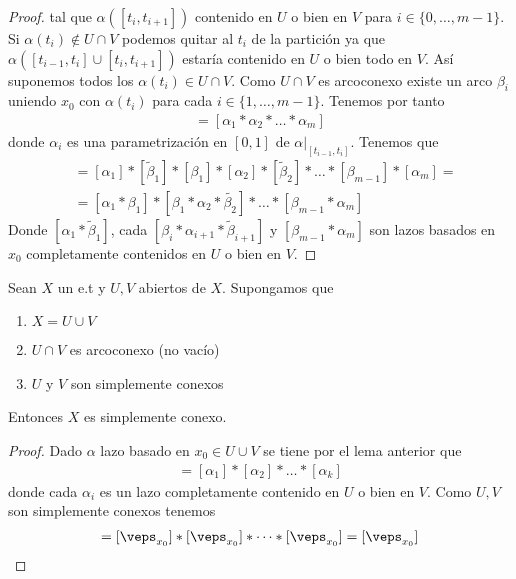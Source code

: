 \begin{lema}
\begin{proof}
        tal que $\alpha([t_i, t_{i+1}])$ contenido en $U$ o bien en $V$ para $i\in\{0,\dots,m-1\}$. Si $\alpha(t_i)\notin U\cap V$ podemos quitar al $t_i$ de la partición ya que $\alpha([t_{i-1}, t_i]\cup [t_i, t_{i+1}])$ estaría contenido en $U$ o bien todo en $V$. Así suponemos todos los $\alpha(t_i)\in U\cap V$. Como $U\cap V$ es arcoconexo existe un arco $\beta_i$ uniendo $x_0$ con $\alpha(t_i)$ para cada $i\in \{1,\dots,m-1\}$. Tenemos por tanto
        \begin{gather*}
            [\alpha] = [\alpha_1\ast\alpha_2\ast\dots\ast\alpha_m]
        \end{gather*}
        donde $\alpha_i$ es una parametrización en $[0,1]$ de $\alpha|_{[t_{i-1}, t_i]}$. Tenemos que
        \begin{align*}
            [\alpha] &= [\alpha_1] \ast [\tilde{\beta}_1] \ast [\beta_1] \ast [\alpha_2]\ast[\tilde{\beta}_2] \ast \dots \ast [\beta_{m-1}] \ast [\alpha_m] =\\
            &= [\alpha_1 \ast \beta_1] \ast [\beta_1\ast \alpha_2 \ast \tilde{\beta_2}] \ast \dots \ast [\beta_{m-1}\ast \alpha_m]
        \end{align*}
        Donde $[\alpha_1\ast \tilde{\beta}_1]$, cada $[\beta_i \ast \alpha_{i+1} \ast \tilde{\beta}_{i+1}]$ y $[\beta_{m-1}\ast \alpha_m]$ son lazos basados en $x_0$ completamente contenidos en $U$ o bien en $V$.
    \end{proof}
\end{lema}

\begin{teo}
    Sean $X$ un e.t y $U,V$ abiertos de $X$. Supongamos que
    \begin{enumerate}
        \item $X=U\cup V$
        \item $U\cap V$ es arcoconexo (no vacío)
        \item $U$ y $V$ son simplemente conexos
    \end{enumerate}
    Entonces $X$ es simplemente conexo.
    \begin{proof}
        Dado $\alpha$ lazo basado en $x_0\in U\cup V$ se tiene por el lema anterior que 
        \begin{gather*}
            [\alpha] = [\alpha_1]\ast [\alpha_2] \ast \dots \ast [\alpha_k]
        \end{gather*}
        donde cada $\alpha_i$ es un lazo completamente contenido en $U$ o bien en $V$. Como $U,V$ son simplemente conexos tenemos
        \begin{gather*}
            [\alpha] = [\veps_{x_0}]\ast[\veps_{x_0}]\ast \dots \ast [\veps_{x_0}] = [\veps_{x_0}]
        \end{gather*}
    \end{proof}
\end{teo}

